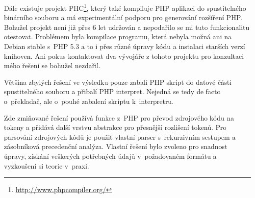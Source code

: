 \documentclass[czech]{ExcelAtFIT}
\begin{document}
		Dále existuje projekt PHC\footnote{\url{http://www.phpcompiler.org/}}, který také kompiluje PHP aplikaci do spustitelného binárního souboru a má experimentální podporu pro generování rozšíření PHP. Bohužel projekt není již přes 6 let udržován a nepodařilo se mi tuto funkcionalitu otestovat. Pro\-blé\-mem byla kompilace programu, která nebyla možná ani na Debian stable s~PHP 5.3 a to i přes různé úpravy kódu a instalaci starších verzí knihoven. Ani pokus kontaktovat dva vývojáře z tohoto projektu pro konzultaci mého řešení se bohužel nezdařil.



		Většina zbylých řešení ve výsledku pouze zabalí PHP skript do datové části spustitelného souboru a přibalí PHP interpret. Nejedná se tedy de facto o~pře\-kla\-dač, ale o~pouhé zabalení skriptu k~interpretru.



		Zde zmiňované řešení používá funkce z~PHP pro převod zdrojového kódu na tokeny a přidává další vrstvu abstrakce pro přesnější rozlišení tokenů. Pro parsování zdrojových kódů je použit vlastní parser s~rekurzivním sestupem a zásobníková precedenční analýza. Vlastní řešení bylo zvoleno pro snadnost úpravy, získání veškerých potřebných údajů v~po\-ža\-do\-va\-ném formátu a vyzkoušení si teorie v~praxi.
\end{document}
